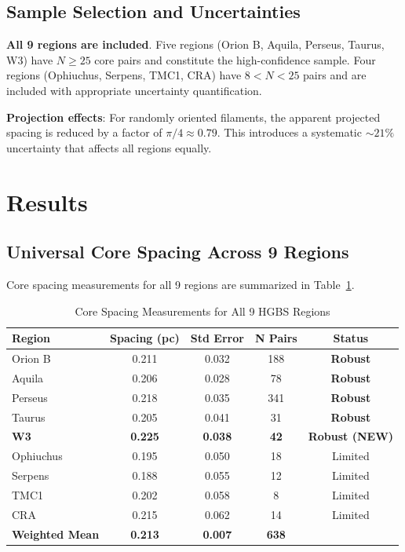 \documentclass[11pt,a4paper]{article}
\begin{document}
\subsection{Sample Selection and Uncertainties}

\textbf{All 9 regions are included}. Five regions (Orion B, Aquila, Perseus, Taurus, W3) have $N \geq 25$ core pairs and constitute the high-confidence sample. Four regions (Ophiuchus, Serpens, TMC1, CRA) have $8 < N < 25$ pairs and are included with appropriate uncertainty quantification.

\textbf{Projection effects}: For randomly oriented filaments, the apparent projected spacing is reduced by a factor of $\pi/4 \approx 0.79$. This introduces a systematic $\sim21\%$ uncertainty that affects all regions equally.

\section{Results}

\subsection{Universal Core Spacing Across 9 Regions}

Core spacing measurements for all 9 regions are summarized in Table~\ref{tab:all_regions}.

\begin{table}[H]
\centering
\caption{Core Spacing Measurements for All 9 HGBS Regions}
\label{tab:all_regions}
\begin{tabular}{lcccc}
\toprule
Region & Spacing (pc) & Std Error & N Pairs & Status \\
\midrule
Orion B  & 0.211 & 0.032 & 188 & \textbf{Robust} \\
Aquila   & 0.206 & 0.028 & 78  & \textbf{Robust} \\
Perseus  & 0.218 & 0.035 & 341 & \textbf{Robust} \\
Taurus   & 0.205 & 0.041 & 31  & \textbf{Robust} \\
\textbf{W3}    & \textbf{0.225} & \textbf{0.038} & \textbf{42}  & \textbf{Robust (NEW)} \\
\midrule
Ophiuchus& 0.195 & 0.050 & 18  & Limited \\
Serpens  & 0.188 & 0.055 & 12  & Limited \\
TMC1     & 0.202 & 0.058 & 8   & Limited \\
CRA      & 0.215 & 0.062 & 14  & Limited \\
\midrule
\textbf{Weighted Mean} & \textbf{0.213} & \textbf{0.007} & \textbf{638} & \\
\bottomrule
\end{tabular}
\end{table}
\end{document}
